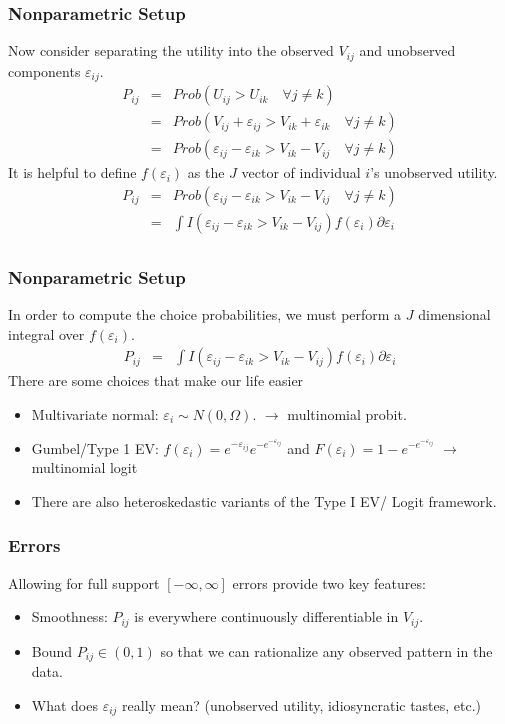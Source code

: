 \documentclass[xcolor=pdftex,dvipsnames,table,mathserif]{beamer}
\begin{document}
\begin{frame}
\frametitle{Nonparametric Setup}
Now consider separating the utility into the observed $V_{ij}$ and unobserved components $\varepsilon_{ij}$.
\begin{eqnarray*}
P_{ij} &=& Prob( U_{ij} > U_{ik} \quad \forall j \neq k)\\
 &=& Prob( V_{ij} + \varepsilon_{ij} > V_{ik} + \varepsilon_{ik} \quad \forall j \neq k)\\
 &=& Prob( \varepsilon_{ij}-\varepsilon_{ik} > V_{ik} - V_{ij} \quad \forall j \neq k)
\end{eqnarray*}
\pause
It is helpful to define $f(\varepsilon_{i})$ as the $J$ vector of individual $i$'s unobserved utility.
\begin{eqnarray*}
P_{ij} &=& Prob( \varepsilon_{ij}-\varepsilon_{ik} > V_{ik} - V_{ij} \quad \forall j \neq k)\\
&=& \int I( \varepsilon_{ij}-\varepsilon_{ik} > V_{ik} - V_{ij} ) f( \varepsilon_i) \partial \varepsilon_i \\
\end{eqnarray*}
\end{frame}

\begin{frame}
\frametitle{Nonparametric Setup}
In order to compute the choice probabilities, we must perform a $J$ dimensional integral over $f(\varepsilon_i)$.
\begin{eqnarray*}
P_{ij} &=&  \int I( \varepsilon_{ij}-\varepsilon_{ik} > V_{ik} - V_{ij} ) f( \varepsilon_i) \partial \varepsilon_i 
\end{eqnarray*}
There are some choices that make our life easier
\begin{itemize}
\item Multivariate normal: $\varepsilon_i  \sim N(0,\Omega)$. $\longrightarrow$ \alert{ multinomial probit}.
\item Gumbel/Type 1 EV: $f(\varepsilon_i) = e^{-\varepsilon_{ij}}  e^{-e^{-\varepsilon_{ij}}}  $ and $F(\varepsilon_i) = 1- e^{-e^{-\varepsilon_{ij}}}$ $\longrightarrow$ \alert{multinomial logit}
\item There are also heteroskedastic variants of the Type I EV/ Logit framework.
\end{itemize}
\end{frame}

\begin{frame}
\frametitle{Errors}
Allowing for full support $[-\infty, \infty]$ errors provide two key features:
\begin{itemize}
\item Smoothness: $P_{ij}$ is everywhere continuously differentiable in $V_{ij}$.
\item Bound $P_{ij} \in (0,1)$ so that we can rationalize any observed pattern in the data.
\item What does $\varepsilon_{ij}$ really mean? (unobserved utility, idiosyncratic tastes, etc.)
\end{itemize}
\end{frame}
\end{document}
